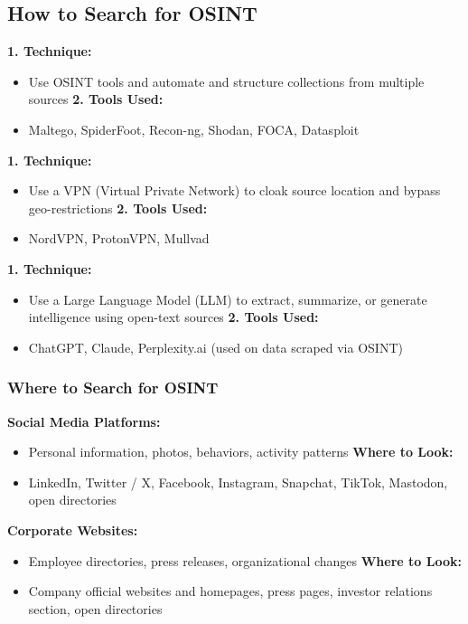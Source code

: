 \subsection{How to Search for OSINT}
\textbf{1. Technique:}
\begin{itemize}
    \item Use OSINT tools and automate and structure collections from multiple sources
\textbf{2. Tools Used:}
\item Maltego, SpiderFoot, Recon-ng, Shodan, FOCA, Datasploit
    \end{itemize}

\textbf{1. Technique:}
\begin{itemize}
    \item     Use a VPN (Virtual Private Network) to cloak source location and bypass geo-restrictions
\textbf{2. Tools Used:}
\item NordVPN, ProtonVPN, Mullvad
    \end{itemize}

\textbf{1. Technique:} 
\begin{itemize}
    \item Use a Large Language Model (LLM) to extract, summarize, or generate intelligence using open-text sources
\textbf{2. Tools Used:}
\item ChatGPT, Claude, Perplexity.ai (used on data scraped via OSINT)
    \end{itemize}

\subsubsection{Where to Search for OSINT}

\textbf{Social Media Platforms:}
\begin{itemize}
    \item Personal information, photos, behaviors, activity patterns
\textbf{Where to Look:}
\item LinkedIn, Twitter / X, Facebook, Instagram, Snapchat, TikTok, Mastodon, open directories
    \end{itemize}

\textbf{Corporate Websites:}
\begin{itemize}
    \item Employee directories, press releases, organizational changes
\textbf{Where to Look:}
\item Company official websites and homepages, press pages, investor relations section, open directories
    \end{itemize}

